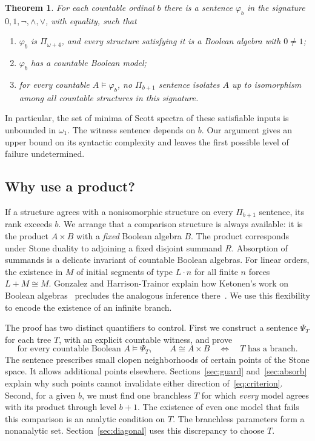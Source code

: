 \documentclass[11pt,letterpaper]{article}
\newtheorem{theorem}{Theorem}[section]
\theoremstyle{definition}\newtheorem{definition}[theorem]{Definition}
\begin{document}
\begin{theorem}\label{thm:main}
For each countable ordinal \(b\) there is a sentence \(\varphi_b\) in the
signature \(0,1,\neg,\wedge,\vee\), with equality, such that
\begin{enumerate}
\item \(\varphi_b\) is \(\Pi_{\omega+4}\), and every structure satisfying it
is a Boolean algebra with \(0\ne1\);
\item \(\varphi_b\) has a countable Boolean model;
\item for every countable \(A\models\varphi_b\), no \(\Pi_{b+1}\) sentence
isolates \(A\) up to isomorphism among all countable structures in this signature.
\end{enumerate}
\end{theorem}
In particular, the set of minima of Scott spectra of these satisfiable inputs
is unbounded in \(\omega_1\). The witness sentence depends on \(b\). Our
argument gives an upper bound on its syntactic complexity and leaves the first
possible level of failure undetermined.

\subsection*{Why use a product?}
If a structure agrees with a nonisomorphic structure on every
\(\Pi_{b+1}\) sentence, its rank exceeds \(b\). We arrange that a comparison
structure is always available: it is the product \(A\times B\) with a
\emph{fixed} Boolean algebra \(B\). The product corresponds under Stone
duality to adjoining a fixed disjoint summand \(R\). Absorption of summands
is a delicate invariant of countable Boolean algebras. For linear orders,
the existence in \(M\) of initial segments of type \(L\cdot n\) for all
finite \(n\) forces \(L+M\cong M\). Gonzalez and Harrison-Trainor
explain how Ketonen's work on Boolean algebras~\cite{ketonen} precludes
the analogous inference there~\cite[\S1]{ght}. We use this flexibility
to encode the existence of an infinite branch.

The proof has two distinct quantifiers to control. First we construct a
sentence \(\Psi_T\) for each tree \(T\), with an explicit countable witness,
and prove
\begin{equation}\label{eq:criterion}
 \text{for every countable Boolean } A\models\Psi_T,\qquad
 A\cong A\times B\quad\Longleftrightarrow\quad T\text{ has a branch}.
\end{equation}
The sentence prescribes small clopen neighborhoods of certain points of the
Stone space. It allows additional points elsewhere. Sections~\ref{sec:guard}
and~\ref{sec:absorb} explain why such points cannot invalidate either
direction of~\eqref{eq:criterion}. Second, for a given \(b\), we must find
one branchless \(T\) for which \emph{every} model agrees with its product
through level \(b+1\). The existence of even one model that fails this
comparison is an analytic condition on \(T\). The branchless parameters form
a nonanalytic set. Section~\ref{sec:diagonal} uses this discrepancy to choose \(T\).
\end{document}
